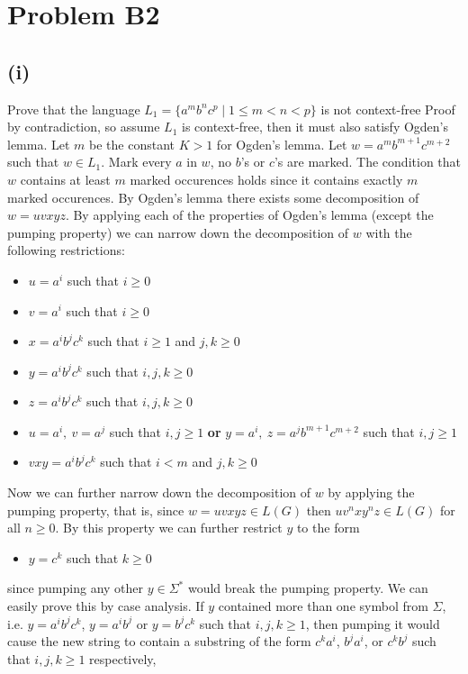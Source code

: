 \documentclass[12pt]{article}
\begin{document}
\section*{Problem B2}
\subsection*{(i)} Prove that the language $L_1 = \{a^mb^nc^p \mid 1\le m<n<p\}$
is not context-free
\medskip \newline
Proof by contradiction, so assume $L_1$ is context-free, then it must also
satisfy Ogden's lemma. Let $m$ be the constant $K > 1$ for Ogden's lemma.
Let $w = a^mb^{m+1}c^{m+2}$ such that $w \in L_1$. Mark every $a$ in $w$,
no $b$'s or $c$'s are marked. The condition that $w$ contains at least $m$
marked occurences holds since it contains exactly $m$ marked occurences.
By Ogden's lemma there exists some decomposition of $w = uvxyz$. By applying
each of the properties of Ogden's lemma (except the pumping property) we can
narrow down the decomposition of $w$ with the following restrictions:
\begin{itemize}
\item $u=a^i$ such that $i\ge 0$
\item $v=a^i$ such that $i\ge 0$
\item $x=a^ib^jc^k$ such that $i\ge 1$ and $j,k\ge 0$
\item $y=a^ib^jc^k$ such that $i,j,k\ge 0$
\item $z=a^ib^jc^k$ such that $i,j,k\ge 0$
\item $u=a^i,\ v=a^j$ such that $i,j\ge 1$ \textbf{or}
$y=a^i,\ z=a^jb^{m+1}c^{m+2}$ such that $i,j\ge 1$
\item $vxy = a^ib^jc^k$ such that $i<m$ and $j,k\ge 0$
\end{itemize}
Now we can further narrow down the decomposition of $w$ by applying the pumping
property, that is, since $w = uvxyz \in L(G)$ then $uv^nxy^nz \in L(G)$ for all
$n \ge 0$. By this property we can further restrict $y$ to the form
\begin{itemize}
\item $y=c^k$ such that $k\ge 0$
\end{itemize}
since pumping any other $y \in \Sigma^*$ would break the pumping property. We
can easily prove this by case analysis. If $y$ contained more than one symbol
from $\Sigma$, i.e. $y=a^ib^jc^k$, $y=a^ib^j$ or $y=b^jc^k$ such that $i,j,k\ge
1$, then pumping it would cause the new string to contain a substring of the
form $c^ka^i$, $b^ja^i$, or $c^kb^j$ such that $i,j,k\ge 1$ respectively,
\end{document}

